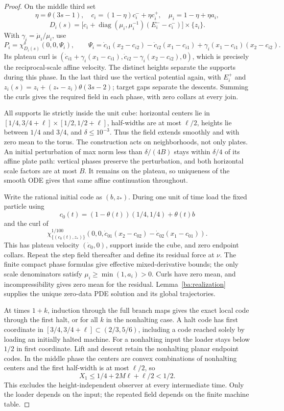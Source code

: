 \begin{proof}
On the middle third set
\[
 \eta=\theta(3s-1),\quad c_i=(1-\eta)c_i^-+\eta c_i^+,
 \quad\mu_i=1-\eta+\eta a_i,
\]
\[
 D_i(s)=
 \big[c_i+\operatorname{diag}(\mu_i,\mu_i^{-1})(E_i^--c_i^-)\big]
 \times\{z_i\}.
\]
With $\gamma_i=\dot\mu_i/\mu_i$, use
\[
 P_i=\chi_{D_i(s)}^\delta(0,0,\Psi_i),\qquad
 \Psi_i=\dot c_{i1}(x_2-c_{i2})-\dot c_{i2}(x_1-c_{i1})
          +\gamma_i(x_1-c_{i1})(x_2-c_{i2}).
\]
Its plateau curl is
$(\dot c_{i1}+\gamma_i(x_1-c_{i1}),
  \dot c_{i2}-\gamma_i(x_2-c_{i2}),0)$,
which is precisely the reciprocal-scale affine velocity.  The distinct
heights separate the supports during this phase.  In the last third use
the vertical potential again, with $E_i^+$ and
$z_i(s)=z_i+(z_*-z_i)\theta(3s-2)$; target gaps separate the descents.
Summing the curls gives the required field in each phase, with zero
collars at every join.

All supports lie strictly inside the unit cube: horizontal centers lie
in $[1/4,3/4+\ell]\times[1/2,1/2+\ell]$, half-widths are at most
$\ell/2$, heights lie between $1/4$ and $3/4$, and
$\delta\le10^{-3}$.  Thus the field extends smoothly and with zero
mean to the torus.  The construction acts on neighborhoods, not only
plates.  An initial perturbation of max norm less than $\delta/(4B)$
stays within $\delta/4$ of its affine plate path: vertical phases
preserve the perturbation, and both horizontal scale factors are at
most $B$.  It remains on the plateau, so uniqueness of the smooth ODE
gives that same affine continuation throughout.

Write the rational initial code as $(b,z_*)$.  During one unit of time
load the fixed particle using
\[
 c_0(t)=(1-\theta(t))(1/4,1/4)+\theta(t)b
\]
and the curl of
\[
 \chi_{\{(c_0(t),z_*)\}}^{1/100}
 (0,0,\dot c_{01}(x_2-c_{02})-\dot c_{02}(x_1-c_{01})).
\]
This has plateau velocity $(\dot c_0,0)$, support inside the cube,
and zero endpoint collars.  Repeat the step field thereafter and define
its residual force at $\nu$.  The finite compact phase formulas give
effective mixed-derivative bounds; the only scale denominators satisfy
$\mu_i\ge\min(1,a_i)>0$.  Curls have zero mean, and incompressibility
gives zero mean for the residual.  Lemma~\ref{ba:realization} supplies
the unique zero-data PDE solution and its global trajectories.

At times $1+k$, induction through the full branch maps gives the exact
local code through the first halt, or for all $k$ in the nonhalting
case.  A halt code has first coordinate in
$[3/4,3/4+\ell]\subset(2/3,5/6)$, including a code reached solely by
loading an initially halted machine.  For a nonhalting input the loader
stays below $1/2$ in first coordinate.  Lift and descent retain the
nonhalting planar endpoint codes.  In the middle phase the centers are
convex combinations of nonhalting centers and the first half-width is
at most $\ell/2$, so
\[
 X_1\le1/4+2M\ell+\ell/2<1/2.
\]
This excludes the height-independent observer at every intermediate
time.  Only the loader depends on the input; the repeated field depends
on the finite machine table.
\end{proof}


